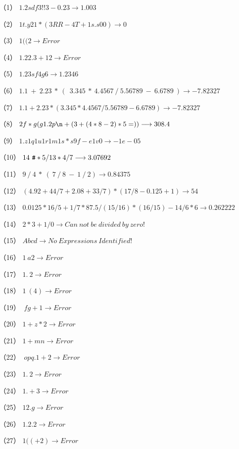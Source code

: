 \documentclass[UTF8]{ctexart}
\begin{document}
\begin{itemize}
    \item[（1）]$1.2sdf3!!3-0.23\longrightarrow 1.003$
    \item[（2）]$1t.y21*(3RR-4T+1s.s00)\longrightarrow 0$
    \item[（3）]$1((2\longrightarrow Error$
    \item[（4）]$1.22.3+12\longrightarrow Error$
    \item[（5）]$1.23sf4g6  \longrightarrow 1.2346$
    \item[（6）]$1.1\ +\ 2.23\ *\ (\ \ 3.345\ *\ 4.4567\ /\ 5.56789\ -\ 6.6789\ ) \longrightarrow -7.82327$
    \item[（7）]$1.1+2.23*(3.345*4.4567/5.56789-6.6789)\longrightarrow -7.82327$
    \item[（8）]$2f*g(g1.2p\verb|\n|+(3+(4*8-2)*5=))\longrightarrow 308.4$
    \item[（9）]$1.z1q1u1r1m1s*s9f-e1v0\longrightarrow -1e-05$
    \item[（10）]$14\ \verb|#|*5/13*4/7\longrightarrow 3.07692$
    \item[（11）]$9\ /\ 4\ *\ (\ 7\ /\ 8\ -\ 1\ /\ 2 )\longrightarrow 0.84375$
    \item[（12）]$(4.92+44/7+2.08+33/7)*(17/8-0.125+1)\longrightarrow 54$
    \item[（13）]$0.0125*16/5+1/7*87.5/(15/16)*(16/15)-14/6*6\longrightarrow 0.262222$
    \item[（14）]$2*3+1/0\longrightarrow Can\ not\ be\ divided\ by\ zero!$
    \item[（15）]$Abcd\longrightarrow No\ Expressions\ Identified!$ 
    \item[（16）]$1\ a2\longrightarrow Error$
    \item[（17）]$1.\ 2\longrightarrow Error$
    \item[（18）]$1\ (4)\longrightarrow Error$
    \item[（19）]$\ fg+1\longrightarrow Error$
    \item[（20）]$1+z*2\longrightarrow Error$
    \item[（21）]$1+mn\longrightarrow Error$
    \item[（22）]$\ opq.1+2\longrightarrow Error$
    \item[（23）]$1.\ 2\longrightarrow Error$
    \item[（24）]$1.+3\longrightarrow Error$
    \item[（25）]$12.g\longrightarrow Error$
    \item[（26）]$1.2.2\longrightarrow Error$
    \item[（27）]$1((+2)\longrightarrow Error$
\end{itemize}
\end{document}
